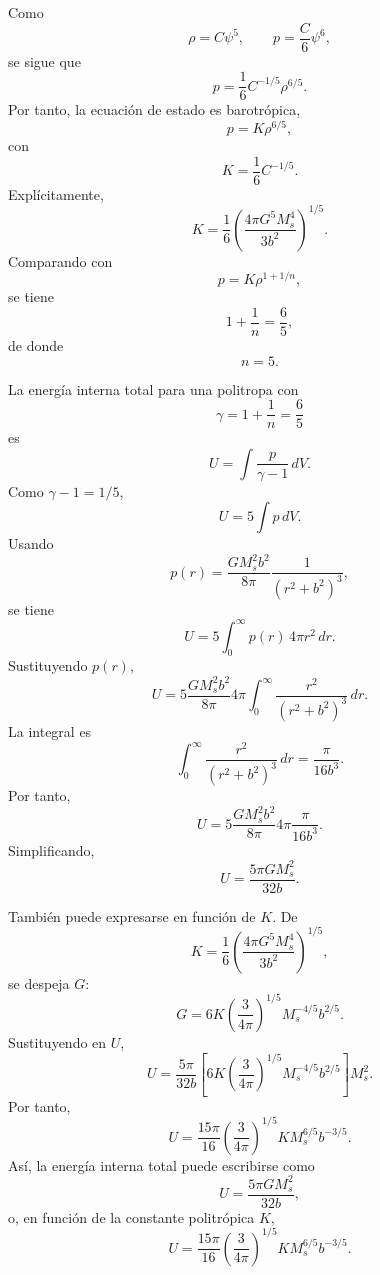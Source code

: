 \documentclass[a4paper]{article}
\begin{document}
Como
$$
\rho=C\psi^5,
\qquad
p=\frac{C}{6}\psi^6,
$$
se sigue que
$$
p=
\frac{1}{6}C^{-1/5}\rho^{6/5}.
$$
Por tanto, la ecuación de estado es barotrópica,
$$
p=K\rho^{6/5},
$$
con
$$
K=\frac{1}{6}C^{-1/5}.
$$
Explícitamente,
$$
K=
\frac{1}{6}
\left(
\frac{4\pi G^5M_s^4}{3b^2}
\right)^{1/5}.
$$
Comparando con
$$
p=K\rho^{1+1/n},
$$
se tiene
$$
1+\frac{1}{n}=\frac{6}{5},
$$
de donde
$$
n=5.
$$

La energía interna total para una politropa con
$$
\gamma=1+\frac{1}{n}=\frac{6}{5}
$$
es
$$
U=
\int \frac{p}{\gamma-1}\,dV.
$$
Como $\gamma-1=1/5$,
$$
U=5\int p\,dV.
$$
Usando
$$
p(r)=
\frac{G M_s^2 b^2}{8\pi}
\frac{1}{(r^2+b^2)^3},
$$
se tiene
$$
U=
5\int_0^\infty
p(r)\,4\pi r^2\,dr.
$$
Sustituyendo $p(r)$,
$$
U=
5
\frac{G M_s^2 b^2}{8\pi}
4\pi
\int_0^\infty
\frac{r^2}{(r^2+b^2)^3}\,dr.
$$
La integral es
$$
\int_0^\infty
\frac{r^2}{(r^2+b^2)^3}\,dr
=
\frac{\pi}{16b^3}.
$$
Por tanto,
$$
U=
5
\frac{G M_s^2 b^2}{8\pi}
4\pi
\frac{\pi}{16b^3}.
$$
Simplificando,
$$
U=
\frac{5\pi G M_s^2}{32b}.
$$

También puede expresarse en función de $K$. De
$$
K=
\frac{1}{6}
\left(
\frac{4\pi G^5M_s^4}{3b^2}
\right)^{1/5},
$$
se despeja $G$:
$$
G=
6K
\left(
\frac{3}{4\pi}
\right)^{1/5}
M_s^{-4/5}b^{2/5}.
$$
Sustituyendo en $U$,
$$
U=
\frac{5\pi}{32b}
\left[
6K
\left(
\frac{3}{4\pi}
\right)^{1/5}
M_s^{-4/5}b^{2/5}
\right]
M_s^2.
$$
Por tanto,
$$
U=
\frac{15\pi}{16}
\left(
\frac{3}{4\pi}
\right)^{1/5}
K M_s^{6/5}b^{-3/5}.
$$
Así, la energía interna total puede escribirse como
$$
U=
\frac{5\pi G M_s^2}{32b},
$$
o, en función de la constante politrópica $K$,
$$
U=
\frac{15\pi}{16}
\left(
\frac{3}{4\pi}
\right)^{1/5}
K M_s^{6/5}b^{-3/5}.
$$
\end{document}

